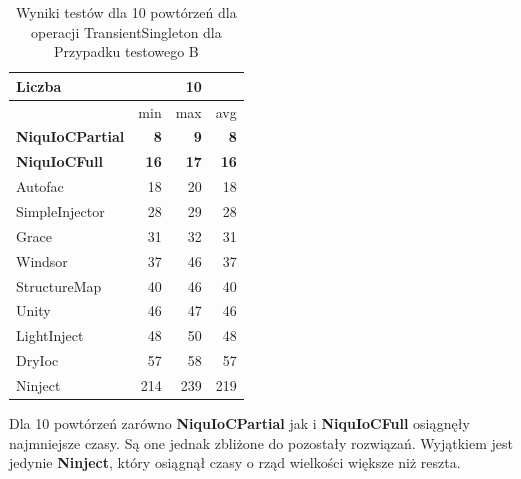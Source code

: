 \documentclass[12pt]{article}
\begin{document}
\begin{table}[H]
\captionsetup{belowskip=0pt,aboveskip=0pt}
\begin{center}
\begin{small}
	\begin{tabular}{ | l | r r r | }
    		\hline
Liczba & & 10 & \\ \hline
 & min & max & avg \\ \hline
\textbf{NiquIoCPartial} & \textbf{8} & \textbf{9} & \textbf{8} \\ \hline
\textbf{NiquIoCFull} & \textbf{16} & \textbf{17} & \textbf{16} \\ \hline
Autofac & 18 & 20 & 18 \\ \hline
SimpleInjector & 28 & 29 & 28 \\ \hline
Grace & 31 & 32 & 31 \\ \hline
Windsor & 37 & 46 & 37 \\ \hline
StructureMap & 40 & 46 & 40 \\ \hline
Unity & 46 & 47 & 46 \\ \hline
LightInject & 48 & 50 & 48 \\ \hline
DryIoc & 57 & 58 & 57 \\ \hline
Ninject & 214 & 239 & 219 \\ \hline
  	\end{tabular}
\end{small}
\end{center}
\caption{Wyniki testów dla 10 powtórzeń dla operacji TransientSingleton dla Przypadku testowego B}
\label{TestCaseB_TransientSingleton10}
\end{table}
Dla 10 powtórzeń zarówno \textbf{NiquIoCPartial} jak i \textbf{NiquIoCFull} osiągnęły najmniejsze czasy. Są one jednak zbliżone do pozostały rozwiązań. Wyjątkiem jest jedynie \textbf{Ninject}, który osiągnął czasy o rząd wielkości większe niż reszta.
\\ \\
\end{document}
